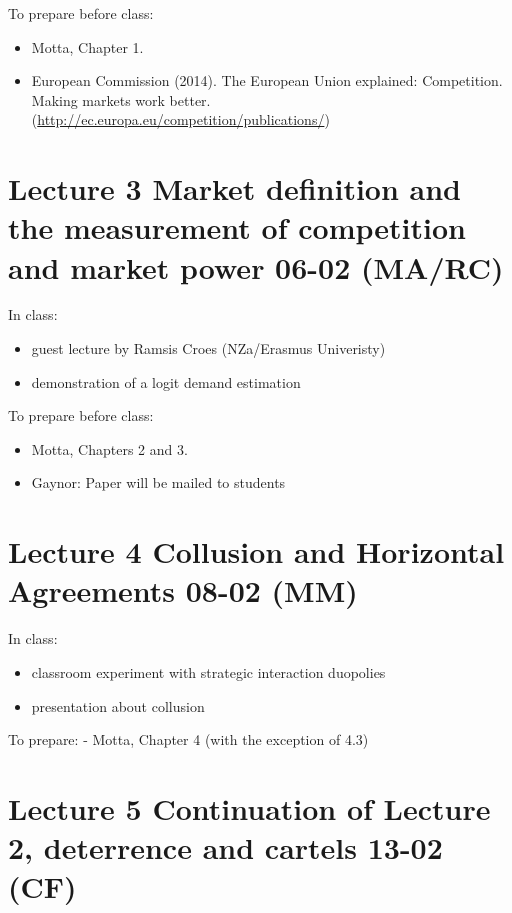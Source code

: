 \documentclass[]{book}
\providecommand{\tightlist}{%
  \setlength{\itemsep}{0pt}\setlength{\parskip}{0pt}}
\begin{document}
To prepare before class:

\begin{itemize}
\tightlist
\item
  Motta, Chapter 1.
\item
  European Commission (2014). The European Union explained: Competition.
  Making markets work better.
  (\url{http://ec.europa.eu/competition/publications/})
\end{itemize}

\section{Lecture 3 Market definition and the measurement of competition
and market power 06-02
(MA/RC)}\label{lecture-3-market-definition-and-the-measurement-of-competition-and-market-power-06-02-marc}

In class:

\begin{itemize}
\tightlist
\item
  guest lecture by Ramsis Croes (NZa/Erasmus Univeristy)
\item
  demonstration of a logit demand estimation
\end{itemize}

To prepare before class:

\begin{itemize}
\tightlist
\item
  Motta, Chapters 2 and 3.
\item
  Gaynor: Paper will be mailed to students
\end{itemize}

\section{Lecture 4 Collusion and Horizontal Agreements 08-02
(MM)}\label{lecture-4-collusion-and-horizontal-agreements-08-02-mm}

In class:

\begin{itemize}
\tightlist
\item
  classroom experiment with strategic interaction duopolies
\item
  presentation about collusion
\end{itemize}

To prepare: - Motta, Chapter 4 (with the exception of 4.3)

\section{Lecture 5 Continuation of Lecture 2, deterrence and cartels
13-02
(CF)}\label{lecture-5-continuation-of-lecture-2-deterrence-and-cartels-13-02-cf}
\end{document}
